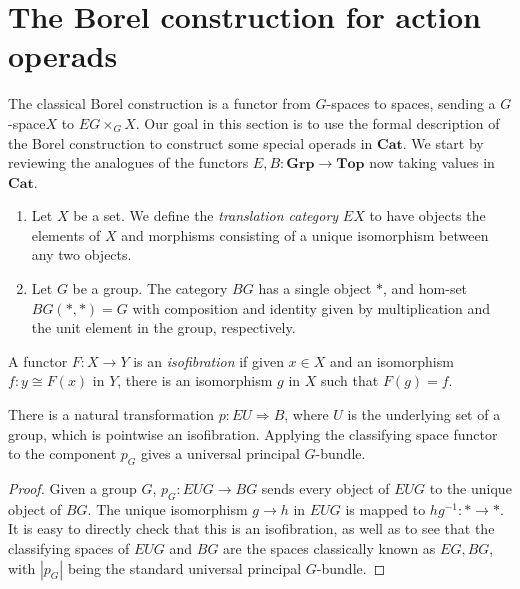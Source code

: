 \documentclass{amsbook} %
\newcommand{\mb}{\mathbf}
\numberwithin{section}{chapter}
\begin{document}
\section{The Borel construction for action operads}


The classical Borel construction is a functor from $G$-spaces to spaces, sending a $G$-space$X$ to $EG \times_{G} X$.  Our goal in this section is to use the formal description of the Borel construction to construct some special operads in $\mb{Cat}$.   We start by reviewing the analogues of the functors $E, B:\mb{Grp} \rightarrow \mb{Top}$ now taking values in $\mb{Cat}$.

\begin{Defi}\label{Defi:e_b}
\begin{enumerate}
\item Let $X$ be a set.  We define the \textit{translation category} $EX$ to have objects the elements of $X$ and morphisms consisting of a unique isomorphism between any two objects.
\item Let $G$ be a group.  The category $BG$ has a single object $*$, and hom-set $BG(*,*) = G$ with composition and identity given by multiplication and the unit element in the group, respectively.
\end{enumerate}
\end{Defi}

\begin{Defi}
A functor $F:X \to Y$ is an \emph{isofibration} if given $x \in X$ and an isomorphism $f: y \cong F(x)$ in $Y$, there is an isomorphism $g$ in $X$ such that $F(g) = f$.
\end{Defi}

\begin{prop}
There is a natural transformation $p:EU \Rightarrow B$, where $U$ is the underlying set of a group, which is pointwise an isofibration.  Applying the classifying space functor to the component $p_{G}$ gives a universal principal $G$-bundle.
\end{prop}
\begin{proof}
Given a group $G$, $p_{G}:EUG \rightarrow BG$ sends every object of $EUG$ to the unique object of $BG$.  The unique isomorphism $g \rightarrow  h$ in $EUG$ is mapped to $hg^{-1}:* \rightarrow *$.  It is easy to directly check that this is an isofibration, as well as to see that the classifying spaces of $EUG$ and $BG$ are the spaces classically known as $EG,BG$, with $|p_{G}|$ being the standard universal principal $G$-bundle.
\end{proof}
\end{document}
